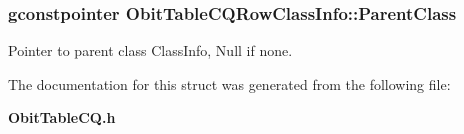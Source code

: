 \subsubsection{\setlength{\rightskip}{0pt plus 5cm}gconstpointer {\bf Obit\-Table\-CQRow\-Class\-Info::Parent\-Class}}\label{structObitTableCQRowClassInfo_o3}


Pointer to parent class Class\-Info, Null if none. 



The documentation for this struct was generated from the following file:\begin{CompactItemize}
\item 
{\bf Obit\-Table\-CQ.h}\end{CompactItemize}
